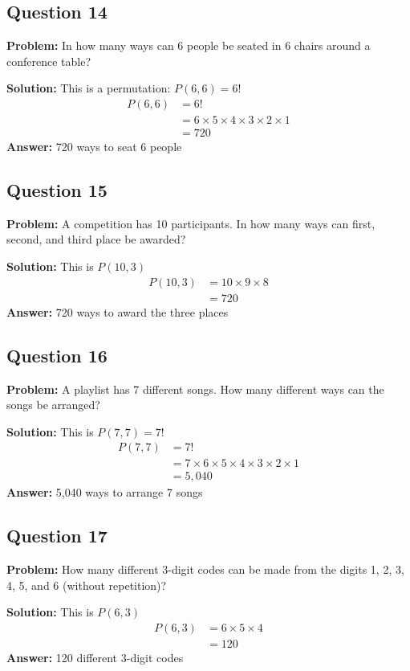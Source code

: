 \documentclass[12pt]{article}
\begin{document}
\subsection*{Question 14}
\textbf{Problem:} In how many ways can 6 people be seated in 6 chairs around a conference table?

\textbf{Solution:} This is a permutation: $P(6,6) = 6!$
\begin{align*}
P(6,6) &= 6! \\
&= 6 \times 5 \times 4 \times 3 \times 2 \times 1 \\
&= 720
\end{align*}
\textbf{Answer:} 720 ways to seat 6 people

\subsection*{Question 15}
\textbf{Problem:} A competition has 10 participants. In how many ways can first, second, and third place be awarded?

\textbf{Solution:} This is $P(10,3)$
\begin{align*}
P(10,3) &= 10 \times 9 \times 8 \\
&= 720
\end{align*}
\textbf{Answer:} 720 ways to award the three places

\subsection*{Question 16}
\textbf{Problem:} A playlist has 7 different songs. How many different ways can the songs be arranged?

\textbf{Solution:} This is $P(7,7) = 7!$
\begin{align*}
P(7,7) &= 7! \\
&= 7 \times 6 \times 5 \times 4 \times 3 \times 2 \times 1 \\
&= 5{,}040
\end{align*}
\textbf{Answer:} 5,040 ways to arrange 7 songs

\subsection*{Question 17}
\textbf{Problem:} How many different 3-digit codes can be made from the digits 1, 2, 3, 4, 5, and 6 (without repetition)?

\textbf{Solution:} This is $P(6,3)$
\begin{align*}
P(6,3) &= 6 \times 5 \times 4 \\
&= 120
\end{align*}
\textbf{Answer:} 120 different 3-digit codes
\end{document}
